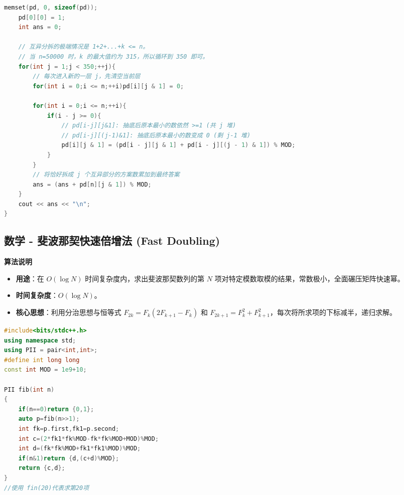 \documentclass[10pt,landscape,a4paper]{article}
\begin{document}
\begin{multicols*}{3}
\begin{lstlisting}[language=C++]
    memset(pd, 0, sizeof(pd));
    pd[0][0] = 1;
    int ans = 0;

    // 互异分拆的极端情况是 1+2+...+k <= n。
    // 当 n=50000 时，k 的最大值约为 315，所以循环到 350 即可。
    for(int j = 1;j < 350;++j){
        // 每次进入新的一层 j，先清空当前层
        for(int i = 0;i <= n;++i)pd[i][j & 1] = 0;

        for(int i = 0;i <= n;++i){
            if(i - j >= 0){
                // pd[i-j][j&1]: 抽底后原本最小的数依然 >=1 (共 j 堆)
                // pd[i-j][(j-1)&1]: 抽底后原本最小的数变成 0 (剩 j-1 堆)
                pd[i][j & 1] = (pd[i - j][j & 1] + pd[i - j][(j - 1) & 1]) % MOD;
            }
        }
        // 将恰好拆成 j 个互异部分的方案数累加到最终答案
        ans = (ans + pd[n][j & 1]) % MOD;
    }
    cout << ans << "\n";
}
\end{lstlisting}
\subsection*{数学 - 斐波那契快速倍增法 (Fast Doubling)}
\par\addvspace{0.7ex}\noindent\textbf{算法说明}\par\nobreak
\begin{itemize}
\item \textbf{用途}：在 $O(\log N)$ 时间复杂度内，求出斐波那契数列的第 $N$ 项对特定模数取模的结果，常数极小，全面碾压矩阵快速幂。
\item \textbf{时间复杂度}：$O(\log N)$。
\item \textbf{核心思想}：利用分治思想与恒等式 $F_{2k} = F_k(2F_{k+1} - F_k)$ 和 $F_{2k+1} = F_k^2 + F_{k+1}^2$，每次将所求项的下标减半，递归求解。
\end{itemize}
\par{}\par
\begin{lstlisting}[language=C++]
#include<bits/stdc++.h>
using namespace std;
using PII = pair<int,int>;
#define int long long
const int MOD = 1e9+10;

PII fib(int n)
{
    if(n==0)return {0,1};
    auto p=fib(n>>1);
    int fk=p.first,fk1=p.second;
    int c=(2*fk1*fk%MOD-fk*fk%MOD+MOD)%MOD;
    int d=(fk*fk%MOD+fk1*fk1%MOD)%MOD;
    if(n&1)return {d,(c+d)%MOD};
    return {c,d};
}
//使用 fin(20)代表求第20项
\end{lstlisting}

\end{multicols*}
\end{document}
